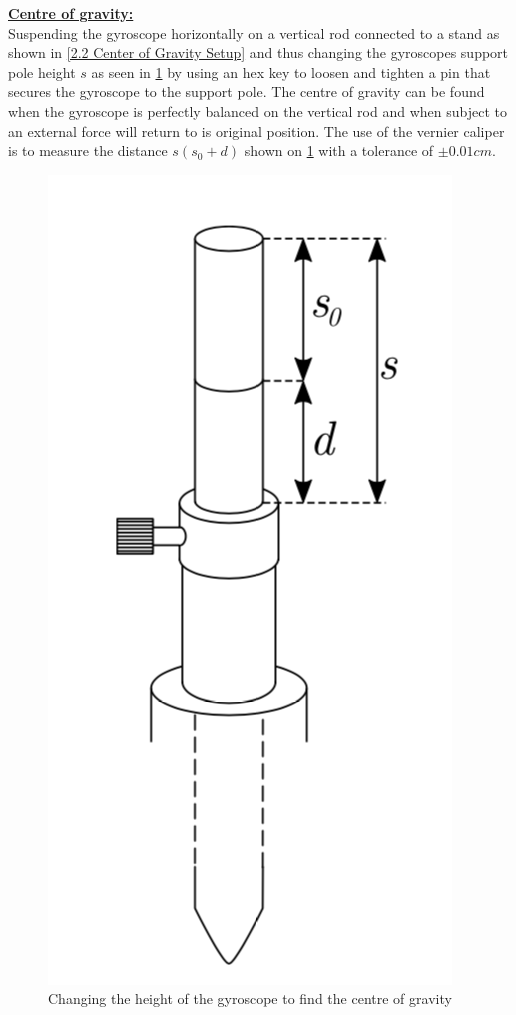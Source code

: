 \documentclass[12pt]{article}
\begin{document}
\textbf{\underline{Centre of gravity:}} \\

Suspending the gyroscope horizontally on a vertical rod connected to a stand as shown in \cref{2.2 Center of Gravity Setup} and thus changing the gyroscopes support pole height $s$ as seen in \cref{Center of gravity height Setup} by using an hex key to loosen and tighten a pin that secures the gyroscope to the support pole. The centre of gravity can be found when the gyroscope is perfectly balanced on the vertical rod and when subject to an external force will return to is original position. The use of the vernier caliper is to measure the distance $s (s_0+d)$ shown on \cref{Center of gravity height Setup} with a tolerance of $\pm0.01cm$. \\

\begin{multicols}{2}
\begin{figure}[H]
\centering
\includegraphics[scale=0.545]{Images/Labscript/Gyroscope_Rod.png}
\caption{Changing the height of the gyroscope to find the centre of gravity \cite{Exp.4-2019}}
\label{Center of gravity height Setup}
\end{figure}


\end{multicols}
\end{document}
